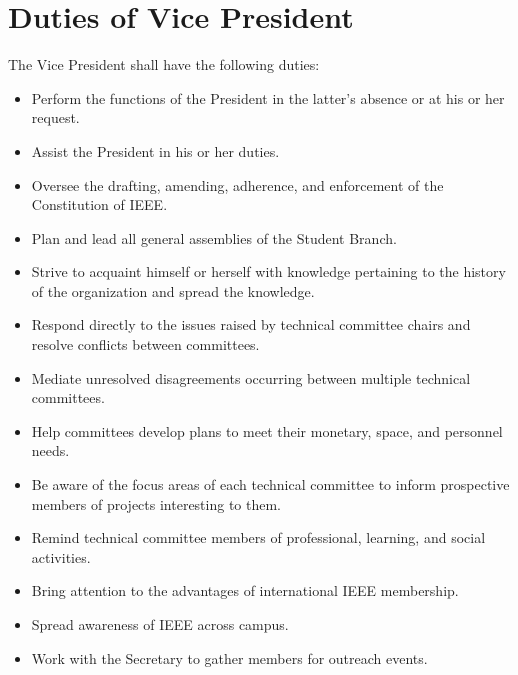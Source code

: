 \documentclass[12pt]{constitution}
\begin{document}
\section{Duties of Vice President}
\label{sec:officer_vp}
The Vice President shall have the following duties:
\begin{itemize}
    \item Perform the functions of the President in the latter’s absence or at his or her request.
    \item Assist the President in his or her duties.
    \item Oversee the drafting, amending, adherence, and enforcement of the Constitution of IEEE.
    \item Plan and lead all general assemblies of the Student Branch.
    \item Strive to acquaint himself or herself with knowledge pertaining to the history of the organization and spread the knowledge.
    \item Respond directly to the issues raised by technical committee chairs and resolve conflicts between committees.
    \item Mediate unresolved disagreements occurring between multiple technical committees.
    \item Help committees develop plans to meet their monetary, space, and personnel needs.
    \item Be aware of the focus areas of each technical committee to inform prospective members of projects interesting to them.
    \item Remind technical committee members of professional, learning, and social activities.
    \item Bring attention to the advantages of international IEEE membership.
    \item Spread awareness of IEEE across campus.
    \item Work with the Secretary to gather members for outreach events.
\end{itemize}
\end{document}
